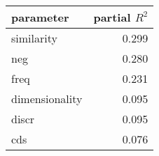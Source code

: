 \begin{tabular}{lr}
\toprule
      parameter &  partial $R^2$ \\
\midrule
     similarity &    0.299 \\
            neg &    0.280 \\
           freq &    0.231 \\
 dimensionality &    0.095 \\
          discr &    0.095 \\
            cds &    0.076 \\
\bottomrule
\end{tabular}
